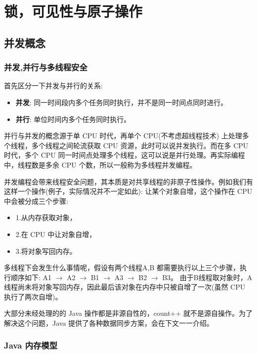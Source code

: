\section{锁，可见性与原子操作}

\subsection{并发概念}

\subsubsection*{并发,并行与多线程安全}

首先区分一下并发与并行的关系:
\begin{itemize}
    \item \textbf{并发}: 同一时间段内多个任务同时执行，并不是同一时间点同时进行。
    \item \textbf{并行}: 单位时间内多个任务同时执行。
\end{itemize}

并行与并发的概念源于单 CPU 时代，再单个 CPU(不考虑超线程技术) 上处理多个线程，多个线程之间轮流获取 CPU 资源，此时可以说并发执行。而在多 CPU 时代，多个 CPU 同一时间点处理多个线程，这可以说是并行处理。再实际编程中，线程数是多余 CPU 个数，所以一般称为多线程并发编程。

并发编程会带来线程安全问题，其本质是对共享线程的非原子性操作。例如我们有这样一个操作(例子，实际情况并不一定如此): 让某个对象自增，这个操作在 CPU 中会被分成三个步骤: 
\begin{itemize}
    \item 1.从内存获取对象，
    \item 2.在 CPU 中让对象自增，
    \item 3.将对象写回内存。
\end{itemize}

多线程下会发生什么事情呢，假设有两个线程A,B 都需要执行以上三个步骤，执行顺序如下: A1 $\rightarrow$ A2 $\rightarrow$ B1 $\rightarrow$ A3 $\rightarrow$ B2 $\rightarrow$ B3。 由于B线程取对象时，A线程尚未将对象写回内存，因此最后该对象在内存中只被自增了一次(虽然 CPU 执行了两次自增)。

大部分未经处理的的 Java 操作都是非源自性的，count++ 就不是源自操作。为了解决这个问题，Java 提供了各种数据同步方案，会在下文一一介绍。

\subsubsection*{Java 内存模型}

